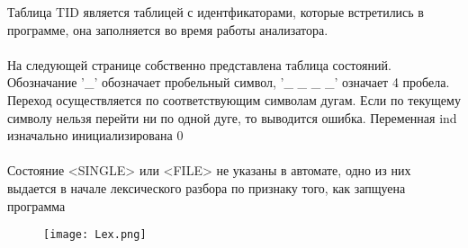 \documentclass[russian,a4paper]{article}
\newcommand{\ts}[1]{<#1>}
\begin{document}
Таблица TID является таблицей с идентфикаторами, которые встретились в программе, она заполняется во время работы анализатора.
\\
\\
На следующей странице собственно представлена таблица состояний. Обозначание '\_' обозначает пробельный символ, '\_ \_ \_ \_' означает 4 пробела. Переход осуществляется по соответствующим символам дугам. Если по текущему символу нельзя перейти ни по одной дуге, то выводится ошибка. Переменная ind изначально инициализирована 0\\
\\
Состояние \ts{SINGLE} или \ts{FILE} не указаны в автомате, одно из них выдается в начале лексического разбора по признаку того, как запщуена программа

\begin{figure} 
  \texttt{[image: Lex.png]}
\end{figure}
\end{document}
